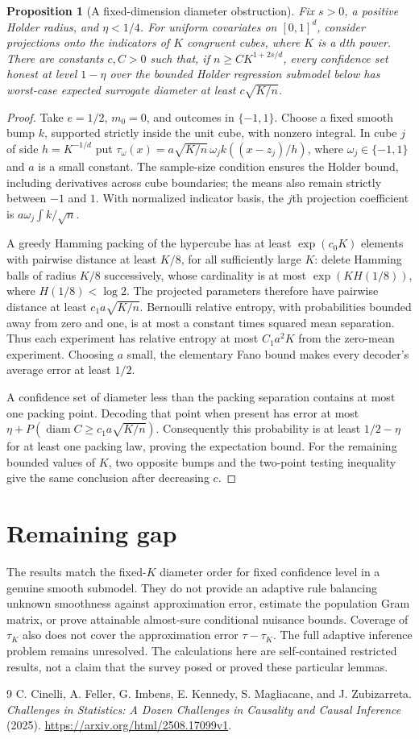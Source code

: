 \documentclass[11pt]{article}
\newtheorem{proposition}[theorem]{Proposition}
\theoremstyle{remark}
\begin{document}
\begin{proposition}[A fixed-dimension diameter obstruction]
Fix $s>0$, a positive Holder radius, and $\eta<1/4$. For uniform covariates on $[0,1]^d$, consider projections onto the indicators of $K$ congruent cubes, where $K$ is a $d$th power. There are constants $c,C>0$ such that, if $n\ge C K^{1+2s/d}$, every confidence set honest at level $1-\eta$ over the bounded Holder regression submodel below has worst-case expected surrogate diameter at least $c\sqrt{K/n}$.
\end{proposition}
\begin{proof}
Take $e=1/2$, $m_0=0$, and outcomes in $\{-1,1\}$. Choose a fixed smooth bump $k$, supported strictly inside the unit cube, with nonzero integral. In cube $j$ of side $h=K^{-1/d}$ put
$\tau_\omega(x)=a\sqrt{K/n}\,\omega_j k((x-z_j)/h)$,
where $\omega_j\in\{-1,1\}$ and $a$ is a small constant. The sample-size condition ensures the Holder bound, including derivatives across cube boundaries; the means also remain strictly between $-1$ and $1$. With normalized indicator basis, the $j$th projection coefficient is $a\omega_j\int k/\sqrt n$.

A greedy Hamming packing of the hypercube has at least $\exp(c_0K)$ elements with pairwise distance at least $K/8$, for all sufficiently large $K$: delete Hamming balls of radius $K/8$ successively, whose cardinality is at most $\exp(K H(1/8))$, where $H(1/8)<\log2$. The projected parameters therefore have pairwise distance at least $c_1a\sqrt{K/n}$. Bernoulli relative entropy, with probabilities bounded away from zero and one, is at most a constant times squared mean separation. Thus each experiment has relative entropy at most $C_1a^2K$ from the zero-mean experiment. Choosing $a$ small, the elementary Fano bound makes every decoder's average error at least $1/2$.

A confidence set of diameter less than the packing separation contains at most one packing point. Decoding that point when present has error at most $\eta+P(\operatorname{diam}C\ge c_1a\sqrt{K/n})$. Consequently this probability is at least $1/2-\eta$ for at least one packing law, proving the expectation bound. For the remaining bounded values of $K$, two opposite bumps and the two-point testing inequality give the same conclusion after decreasing $c$.
\end{proof}

\section*{Remaining gap}
The results match the fixed-$K$ diameter order for fixed confidence level in a genuine smooth submodel. They do not provide an adaptive rule balancing unknown smoothness against approximation error, estimate the population Gram matrix, or prove attainable almost-sure conditional nuisance bounds. Coverage of $\tau_K$ also does not cover the approximation error $\tau-\tau_K$. The full adaptive inference problem remains unresolved. The calculations here are self-contained restricted results, not a claim that the survey posed or proved these particular lemmas.

\begin{thebibliography}{9}
 C. Cinelli, A. Feller, G. Imbens, E. Kennedy, S. Magliacane, and J. Zubizarreta. \emph{Challenges in Statistics: A Dozen Challenges in Causality and Causal Inference} (2025). \url{https://arxiv.org/html/2508.17099v1}.
\end{thebibliography}
\end{document}
